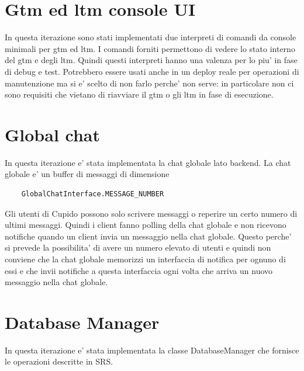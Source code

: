 \section{Gtm ed ltm console UI}
  In questa iterazione sono stati implementati due interpreti di comandi da console minimali per gtm ed ltm. I comandi forniti permettono di vedere lo stato interno del gtm e degli ltm. Quindi questi interpreti hanno una valenza per lo piu' in fase di debug e test. Potrebbero essere usati anche in un deploy reale per operazioni di manutenzione ma si e' scelto di non farlo perche' non serve: in particolare non ci sono requisiti che vietano di riavviare il gtm o gli ltm in fase di esecuzione.

\section{Global chat}
  In questa iterazione e' stata implementata la chat globale lato backend. La chat globale e' un buffer di messaggi di dimensione 
  \begin{verbatim}
    GlobalChatInterface.MESSAGE_NUMBER
  \end{verbatim}
  Gli utenti di Cupido possono solo scrivere messaggi o reperire un certo numero di ultimi messaggi. Quindi i client fanno polling della chat globale e non ricevono notifiche quando un client invia un messaggio nella chat globale. Questo perche' si prevede la possibilita' di avere un numero elevato di utenti e quindi non conviene che la chat globale memorizzi un interfaccia di notifica per ognuno di essi e che invii notifiche a questa interfaccia ogni volta che arriva un nuovo messaggio nella chat globale.

\section{Database Manager}
  In questa iterazione e' stata implementata la classe DatabaseManager che fornisce le operazioni descritte in SRS.


